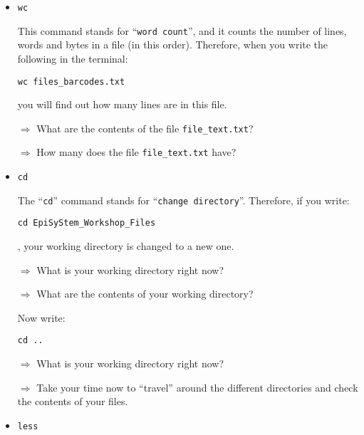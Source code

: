 \documentclass[11pt]{article}
\begin{document}
\begin{itemize}
\item \texttt{wc}

This command stands for ``\texttt{word count}'', and it counts the number of lines, words and bytes in a file (in this order). Therefore, when you write the following in the terminal:
\begin{verbatim}
wc files_barcodes.txt
\end{verbatim}
you will find out how many lines are in this file. 

\vspace{1em}
\hrulefill

$\Rightarrow$ What are the contents of the file \texttt{file\_text.txt}?

$\Rightarrow$ How many does the file \texttt{file\_text.txt} have?

\hrulefill
\vspace{1em}

\item \texttt{cd}

The ``\texttt{cd}'' command stands for ``\texttt{change directory}''. Therefore, if you write:

\begin{verbatim}
cd EpiSyStem_Workshop_Files
\end{verbatim}

, your working directory is changed to a new one. 

\vspace{1em}
\hrulefill

$\Rightarrow$ What is your working directory right now?

$\Rightarrow$ What are the contents of your working directory?

\hrulefill
\vspace{1em}

Now write:

\begin{verbatim}
cd ..
\end{verbatim}

\vspace{1em}
\hrulefill

$\Rightarrow$ What is your working directory right now?

$\Rightarrow$ Take your time now to ``travel'' around the different directories and check the contents of your files. 

\hrulefill
\vspace{1em}

\item \texttt{less}


\end{itemize}
\end{document}
